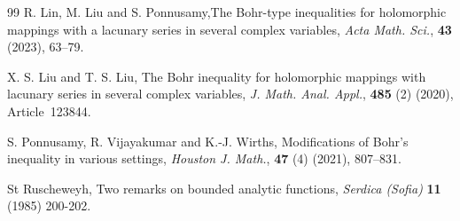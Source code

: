 \documentclass[11pt, reqno]{amsart}
\newtheorem*{cor A}{Corollary A}
\newtheorem*{cor B}{Corollary B}
\numberwithin{equation}{section}
\begin{document}
\begin{thebibliography}{99}
 {\sc R. Lin, M. Liu and S. Ponnusamy},The Bohr-type inequalities for holomorphic mappings with a lacunary series in several complex variables, \textit{Acta Math. Sci.}, \textbf{43} (2023), 63--79.

 {\sc X. S. Liu and T. S. Liu}, The Bohr inequality for holomorphic mappings with lacunary series in several complex variables,
\textit{J. Math. Anal. Appl.}, \textbf{485} (2) (2020), Article~123844.

 {\sc S. Ponnusamy, R. Vijayakumar and K.-J. Wirths}, Modifications of Bohr's inequality in various settings,
\textit{Houston J. Math.}, \textbf{47} (4) (2021), 807--831.

 {\sc St Ruscheweyh}, Two remarks on bounded analytic functions, \textit{Serdica (Sofia)} \textbf{11} (1985) 200-202.
\end{thebibliography}
\end{document}
